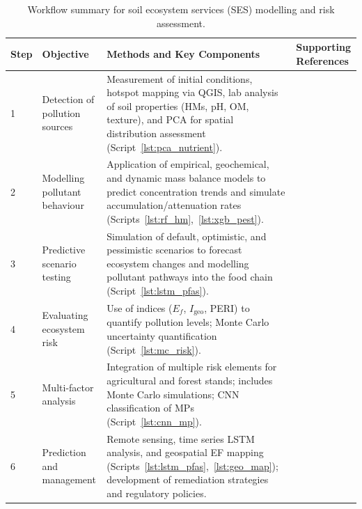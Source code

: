 \documentclass[environments,article,submit,pdftex,moreauthors]{Definitions/mdpi}
\begin{document}
\begin{table}[H]
\caption{Workflow summary for soil ecosystem services (SES) modelling and
    risk assessment.\label{tab:ses_workflow_v2}}
\begin{tabularx}{\textwidth}{p{0.6cm} p{3.0cm} X p{3.5cm}}
\toprule
\textbf{Step} & \textbf{Objective} & \textbf{Methods and Key Components}
    & \textbf{Supporting References} \\
\midrule
1 & Detection of pollution sources
    & Measurement of initial conditions, hotspot mapping via QGIS, lab
      analysis of soil properties (HMs, pH, OM, texture), and PCA for
      spatial distribution assessment (Script~\ref{lst:pca_nutrient}).
    & \cite{Adewumi2024,ElSorogy2025,Mukhopadhyay2020,Wan2019} \\[6pt]
2 & Modelling pollutant behaviour
    & Application of empirical, geochemical, and dynamic mass balance models
      to predict concentration trends and simulate accumulation/attenuation
      rates (Scripts~\ref{lst:rf_hm},~\ref{lst:xgb_pest}).
    & \cite{Giannakis2017,Koukianaki2025,LindhLemenkova2022b,Mohammad2025,PerezLucas2025,Xu2026} \\[6pt]
3 & Predictive scenario testing
    & Simulation of default, optimistic, and pessimistic scenarios to
      forecast ecosystem changes and modelling pollutant pathways into the
      food chain (Script~\ref{lst:lstm_pfas}).
    & \cite{Appel2022,GonzalezRodriguez2011,Hossini2025,Lemenkova2024a,Wang2025,Yasir2025} \\[6pt]
4 & Evaluating ecosystem risk
    & Use of indices ($E_f$, $I_{\mathrm{geo}}$, PERI) to quantify
      pollution levels; Monte Carlo uncertainty quantification
      (Script~\ref{lst:mc_risk}).
    & \cite{AnsoarRodriguez2025,Chukwuonye2025,Egbueri2020,Ferreira2022,Kim2024,Li2025a} \\[6pt]
5 & Multi-factor analysis
    & Integration of multiple risk elements for agricultural and forest
      stands; includes Monte Carlo simulations; CNN classification of MPs
      (Script~\ref{lst:cnn_mp}).
    & \cite{Li2025a,Proshad2025,Wang2024b} \\[6pt]
6 & Prediction and management
    & Remote sensing, time series LSTM analysis, and geospatial EF mapping
      (Scripts~\ref{lst:lstm_pfas},~\ref{lst:geo_map}); development of
      remediation strategies and regulatory policies.
    & \cite{Lemenkova2025e,Stojic2019,Xu2025} \\
\bottomrule
\end{tabularx}
\end{table}
\end{document}
